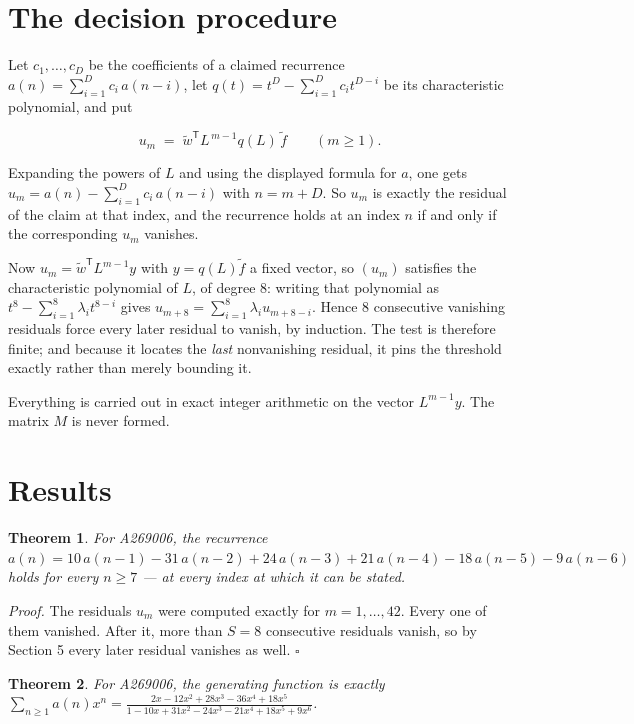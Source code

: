 \documentclass[11pt]{article}
\newtheorem{theorem}{Theorem}
\theoremstyle{definition}
\begin{document}
\section{The decision procedure}

Let $c_1,\dots,c_D$ be the coefficients of a claimed recurrence $a(n) = \sum_{i=1}^{D} c_i\,a(n-i)$, let $q(t) = t^{D} - \sum_{i=1}^{D} c_i t^{D-i}$ be its characteristic polynomial, and put

\[u_m \;=\; \tilde w^{\mathsf T} L^{\,m-1} q(L)\,\tilde f \qquad (m \ge 1).\]

Expanding the powers of $L$ and using the displayed formula for $a$, one gets $u_m = a(n) - \sum_{i=1}^{D} c_i\,a(n-i)$ with $n = m + D$. So $u_m$ is exactly the residual of the claim at that index, and the recurrence holds at an index $n$ if and only if the corresponding $u_m$ vanishes.

Now $u_m = \tilde w^{\mathsf T} L^{m-1} y$ with $y = q(L)\tilde f$ a fixed vector, so $(u_m)$ satisfies the characteristic polynomial of $L$, of degree $8$: writing that polynomial as $t^{8} - \sum_{i=1}^{8} \lambda_i t^{8-i}$ gives $u_{m+8} = \sum_{i=1}^{8} \lambda_i u_{m+8-i}$. Hence $8$ consecutive vanishing residuals force every later residual to vanish, by induction. The test is therefore finite; and because it locates the {\itshape last} nonvanishing residual, it pins the threshold exactly rather than merely bounding it.

Everything is carried out in exact integer arithmetic on the vector $L^{m-1}y$. The matrix $M$ is never formed.

\section{Results}

\begin{theorem} For A269006, the recurrence $a(n) = 10\,a(n-1) - 31\,a(n-2) + 24\,a(n-3) + 21\,a(n-4) - 18\,a(n-5) - 9\,a(n-6)$ holds for every $n \ge 7$ --- at every index at which it can be stated.\end{theorem}

{\itshape Proof.} The residuals $u_m$ were computed exactly for $m = 1,\dots,42$. Every one of them vanished. After it, more than $S = 8$ consecutive residuals vanish, so by Section 5 every later residual vanishes as well. $\square$

\begin{theorem} For A269006, the generating function is exactly $\sum_{n\ge 1} a(n)x^n = \frac{2x - 12x^{2} + 28x^{3} - 36x^{4} + 18x^{5}}{1 - 10x + 31x^{2} - 24x^{3} - 21x^{4} + 18x^{5} + 9x^{6}}$.\end{theorem}
\end{document}
